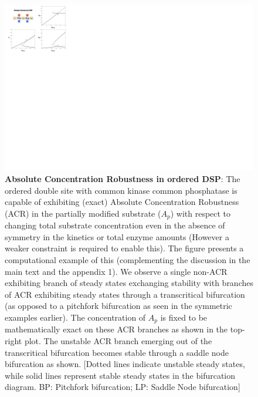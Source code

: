 \documentclass[9pt,lineno]{elife}
\begin{document}
\clearpage
\begin{figure}[ht!]
    \centering
    \includegraphics[width = 0.75\linewidth, keepaspectratio]{FigS09.pdf}
    \caption{\textbf{Absolute Concentration Robustness in ordered DSP}: The ordered double site with common kinase common phosphatase is capable of exhibiting (exact) Absolute Concentration Robustness (ACR) in the partially modified substrate ($A_p$) with respect to changing total substrate concentration even in the absence of symmetry in the kinetics or total enzyme amounts (However a weaker constraint is required to enable this). The figure presents a computational example of this (complementing the discussion in the main text and the appendix 1). We observe a single non-ACR exhibiting branch of steady states exchanging stability with branches of ACR exhibiting steady states through a transcritical bifurcation (as opposed to a pitchfork bifurcation as seen in the symmetric examples earlier). The concentration of $A_p$ is fixed to be mathematically exact on these ACR branches as shown in the top-right plot. The unstable ACR branch emerging out of the transcritical bifurcation becomes stable through a saddle node bifurcation as shown. [Dotted lines indicate unstable steady states, while solid lines represent stable steady states in the bifurcation diagram. BP: Pitchfork bifurcation; LP: Saddle Node bifurcation]}
    \label{Fig S9}
\end{figure}
\end{document}
